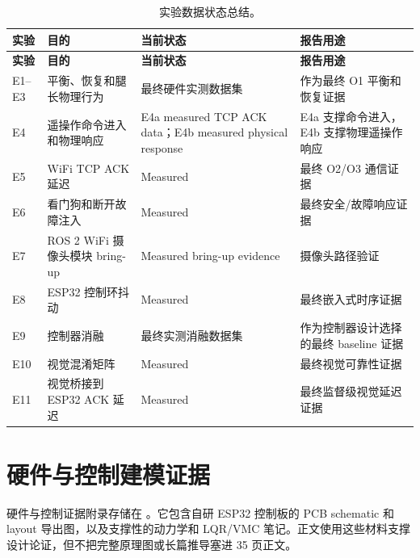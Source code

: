 \documentclass[12pt, a4paper]{article}
\begin{document}
\begingroup
\singlespacing
\scriptsize
\setlength{\tabcolsep}{2pt}
\renewcommand{\arraystretch}{1.15}
\begin{longtable}{>{\RaggedRight\arraybackslash}p{}>{\RaggedRight\arraybackslash}p{}>{\RaggedRight\arraybackslash}p{}>{\RaggedRight\arraybackslash}p{}}
\caption{实验数据状态总结。}\\
\toprule
\textbf{实验} & \textbf{目的} & \textbf{当前状态} & \textbf{报告用途} \\
\midrule
\endfirsthead
\toprule
\textbf{实验} & \textbf{目的} & \textbf{当前状态} & \textbf{报告用途} \\
\midrule
\endhead
E1--E3 & 平衡、恢复和腿长物理行为 & 最终硬件实测数据集 & 作为最终 O1 平衡和恢复证据 \\
E4 & 遥操作命令进入和物理响应 & E4a measured TCP ACK data；E4b measured physical response & E4a 支撑命令进入，E4b 支撑物理遥操作响应 \\
E5 & WiFi TCP ACK 延迟 & Measured & 最终 O2/O3 通信证据 \\
E6 & 看门狗和断开故障注入 & Measured & 最终安全/故障响应证据 \\
E7 & ROS 2 WiFi 摄像头模块 bring-up & Measured bring-up evidence & 摄像头路径验证 \\
E8 & ESP32 控制环抖动 & Measured & 最终嵌入式时序证据 \\
E9 & 控制器消融 & 最终实测消融数据集 & 作为控制器设计选择的最终 baseline 证据 \\
E10 & 视觉混淆矩阵 & Measured & 最终视觉可靠性证据 \\
E11 & 视觉桥接到 ESP32 ACK 延迟 & Measured & 最终监督级视觉延迟证据 \\
\bottomrule
\end{longtable}
\endgroup

\section{硬件与控制建模证据}
硬件与控制证据附录存储在 。它包含自研 ESP32 控制板的 PCB schematic 和 layout 导出图，以及支撑性的动力学和 LQR/VMC 笔记。正文使用这些材料支撑设计论证，但不把完整原理图或长篇推导塞进 35 页正文。
\end{document}
